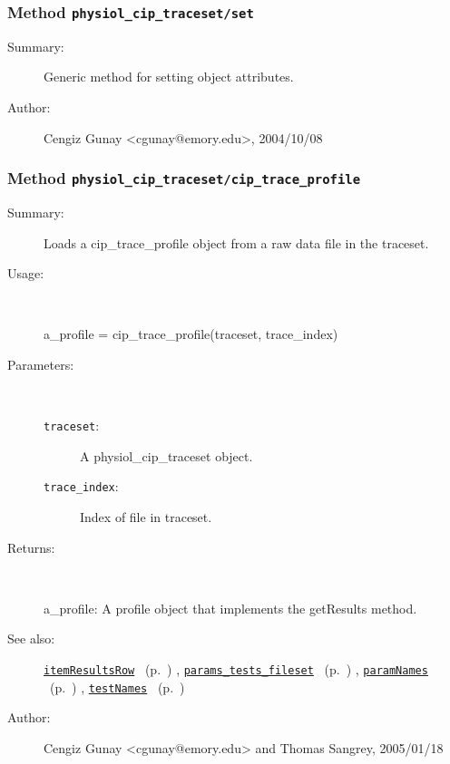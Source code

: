 \subsubsection[Method \texttt{set}]{Method \texttt{physiol\_cip\_traceset/set}}%
%
\label{ref_physiol_cip_traceset__set}%
\hypertarget{ref_physiol_cip_traceset__set}{}%
\begin{description}
\item[Summary:]Generic method for setting object attributes.
%
%
%
%
%
%
%
\item[Author:]%
Cengiz Gunay <cgunay@emory.edu>, 2004/10/08%
\end{description}
\methodline%
\subsubsection[Method \texttt{cip\_trace\_profile}]{Method \texttt{physiol\_cip\_traceset/cip\_trace\_profile}}%
%
\label{ref_physiol_cip_traceset__cip_trace_profile}%
\hypertarget{ref_physiol_cip_traceset__cip_trace_profile}{}%
\begin{description}
\item[Summary:]Loads a cip\_trace\_profile object from a raw data file in the traceset.
%
\item[Usage:]~%
\begin{lyxcode}%
a\_profile = cip\_trace\_profile(traceset, trace\_index)
%
\end{lyxcode}%
%
%
\item[Parameters:]~
\begin{description}%
\item[\texttt{traceset}:]
 A physiol\_cip\_traceset object.
\item[\texttt{trace\_index}:]
 Index of file in traceset.
\end{description}%
%
\item[Returns:]~

	a\_profile: A profile object that implements the getResults method.
%
%
\item[See also:]%
\hyperlink{ref_itemResultsRow}{\texttt{itemResultsRow}}%
\ (p.~\pageref{ref_itemResultsRow})%
%
, \hyperlink{ref_params_tests_fileset}{\texttt{params\_tests\_fileset}}%
\ (p.~\pageref{ref_params_tests_fileset})%
%
, \hyperlink{ref_paramNames}{\texttt{paramNames}}%
\ (p.~\pageref{ref_paramNames})%
%
, \hyperlink{ref_testNames}{\texttt{testNames}}%
\ (p.~\pageref{ref_testNames})%
%
%
\item[Author:]%
Cengiz Gunay <cgunay@emory.edu> and Thomas Sangrey, 2005/01/18%
\end{description}
\methodline%
